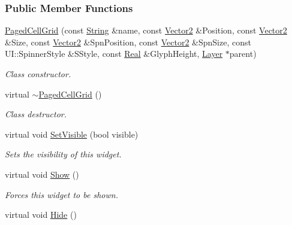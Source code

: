 \subsubsection*{Public Member Functions}
\begin{DoxyCompactItemize}
\item 
\hyperlink{classphys_1_1UI_1_1PagedCellGrid_a0b5ab33e9ec040898fc667682016003d}{PagedCellGrid} (const \hyperlink{namespacephys_aa03900411993de7fbfec4789bc1d392e}{String} \&name, const \hyperlink{classphys_1_1Vector2}{Vector2} \&Position, const \hyperlink{classphys_1_1Vector2}{Vector2} \&Size, const \hyperlink{classphys_1_1Vector2}{Vector2} \&SpnPosition, const \hyperlink{classphys_1_1Vector2}{Vector2} \&SpnSize, const UI::SpinnerStyle \&SStyle, const \hyperlink{namespacephys_af7eb897198d265b8e868f45240230d5f}{Real} \&GlyphHeight, \hyperlink{classphys_1_1UI_1_1Layer}{Layer} $\ast$parent)
\begin{DoxyCompactList}\small\item\em Class constructor. \item\end{DoxyCompactList}\item 
\hypertarget{classphys_1_1UI_1_1PagedCellGrid_a6b9c8876b41321b77321efcf27feb2c6}{
virtual \hyperlink{classphys_1_1UI_1_1PagedCellGrid_a6b9c8876b41321b77321efcf27feb2c6}{$\sim$PagedCellGrid} ()}
\label{d5/d27/classphys_1_1UI_1_1PagedCellGrid_a6b9c8876b41321b77321efcf27feb2c6}

\begin{DoxyCompactList}\small\item\em Class destructor. \item\end{DoxyCompactList}\item 
virtual void \hyperlink{classphys_1_1UI_1_1PagedCellGrid_a76ff4b649f4687203ba9d1473474ce99}{SetVisible} (bool visible)
\begin{DoxyCompactList}\small\item\em Sets the visibility of this widget. \item\end{DoxyCompactList}\item 
\hypertarget{classphys_1_1UI_1_1PagedCellGrid_aae7ae6fbe4d0fc1006c6abd8d1f22727}{
virtual void \hyperlink{classphys_1_1UI_1_1PagedCellGrid_aae7ae6fbe4d0fc1006c6abd8d1f22727}{Show} ()}
\label{d5/d27/classphys_1_1UI_1_1PagedCellGrid_aae7ae6fbe4d0fc1006c6abd8d1f22727}

\begin{DoxyCompactList}\small\item\em Forces this widget to be shown. \item\end{DoxyCompactList}\item 
\hypertarget{classphys_1_1UI_1_1PagedCellGrid_ae4cbcf05df48dfcb0871f4d3604010ec}{
virtual void \hyperlink{classphys_1_1UI_1_1PagedCellGrid_ae4cbcf05df48dfcb0871f4d3604010ec}{Hide} ()}
\label{d5/d27/classphys_1_1UI_1_1PagedCellGrid_ae4cbcf05df48dfcb0871f4d3604010ec}


\end{DoxyCompactItemize}

